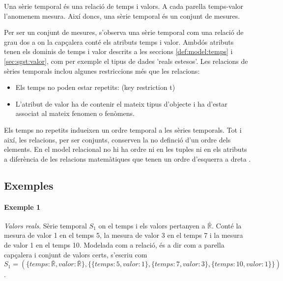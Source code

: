Una sèrie temporal és una relació de temps i valors. A cada parella temps-valor l'anomenem mesura. Així doncs, una sèrie temporal és un conjunt de mesures.

Per ser un conjunt de mesures, s'observa una sèrie temporal com una
relació de grau dos a on la capçalera conté els atributs temps i
valor. Ambdós atributs tenen els dominis de temps i valor descrits a
les seccions \ref{def:model:temps} i \ref{sec:sgst:valor}, com per
exemple el tipus de dades 'reals estesos'. Les relacions de sèries
temporals inclou algunes restriccions més que les relacions:

\begin{itemize}
\item Els temps no poden estar repetits: (key restriction {t})
\item L'atribut de valor ha de contenir el mateix tipus d'objecte i ha
  d'estar associat al mateix fenomen o fenòmens.
\end{itemize}

Els temps no repetits indueixen un ordre temporal a les sèries
temporals. Tot i així, les relacions, per ser conjunts, conserven la
no definció d'un ordre dels elements. En el model relacional no hi ha
ordre ni en les tuples ni en els atributs a diferència de les
relacions matemàtiques que tenen un ordre d'esquerra a
dreta \parencite[sec.\ 5.3]{date:introduction}.

\subsection{Exemples}





\paragraph{Exemple 1} \emph{Valors reals}.
Sèrie temporal $S_1$ on el temps i els valors pertanyen a $\bar{\mathbb{R}}$. Conté la mesura de valor 1 en el temps 5, la mesura de valor 3 en el temps 7 i la mesura de valor 1 en el temps 10. Modelada com a relació, és a dir com a parella capçalera i conjunt de valors certs, s'escriu com 
$S_1 = ( \{temps: \bar{\mathbb{R}}, valor: \bar{\mathbb{R}}\}, \{ \{temps:5,valor:1\}, \{temps:7,valor:3\}, \{temps:10,valor:1\} \} )$.

